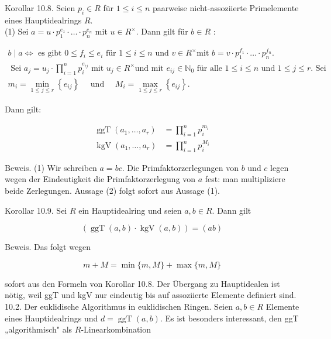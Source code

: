 \documentclass[10pt, letterpaper]{article}
\begin{document}
Korollar 10.8. Seien $p_{i} \in R$ für $1 \leq i \leq n$ paarweise nicht-assoziierte Primelemente eines Hauptidealrings $R$.\\
(1) Sei $a=u \cdot p_{1}^{e_{1}} \cdot \ldots \cdot p_{n}^{e_{n}}$ mit $u \in R^{\times}$. Dann gilt für $b \in R$ :

$$
\begin{gathered}
b \mid a \Longleftrightarrow \text { es gibt } 0 \leq f_{i} \leq e_{i} \text { für } 1 \leq i \leq n \text { und } v \in R^{\times} \text {mit } b=v \cdot p_{1}^{f_{1}} \cdot \ldots \cdot p_{n}^{f_{n}} . \\
\text { Sei } a_{j}=u_{j} \cdot \prod_{i=1}^{n} p_{i}^{e_{i j}} \text { mit } u_{j} \in R^{\times} \text {und mit } e_{i j} \in \mathbb{N}_{0} \text { für alle } 1 \leq i \leq n \text { und } 1 \leq j \leq r . \text { Sei } \\
m_{i}=\min _{1 \leq j \leq r}\left\{e_{i j}\right\} \quad \text { und } \quad M_{i}=\max _{1 \leq j \leq r}\left\{e_{i j}\right\} .
\end{gathered}
$$

Dann gilt:

$$
\begin{aligned}
\operatorname{ggT}\left(a_{1}, \ldots, a_{r}\right) & =\prod_{i=1}^{n} p_{i}^{m_{i}} \\
\operatorname{kgV}\left(a_{1}, \ldots, a_{r}\right) & =\prod_{i=1}^{n} p_{i}^{M_{i}}
\end{aligned}
$$

Beweis. (1) Wir schreiben $a=b c$. Die Primfaktorzerlegungen von $b$ und $c$ legen wegen der Eindeutigkeit die Primfaktorzerlegung von $a$ fest: man multipliziere beide Zerlegungen. Aussage (2) folgt sofort aus Aussage (1).

Korollar 10.9. Sei $R$ ein Hauptidealring und seien $a, b \in R$. Dann gilt

$$
(\operatorname{ggT}(a, b) \cdot \operatorname{kgV}(a, b))=(a b)
$$

Beweis. Das folgt wegen

$$
m+M=\min \{m, M\}+\max \{m, M\}
$$

sofort aus den Formeln von Korollar 10.8. Der Übergang zu Hauptidealen ist nötig, weil ggT und kgV nur eindeutig bis auf assoziierte Elemente definiert sind.\\
10.2. Der euklidische Algorithmus in euklidischen Ringen. Seien $a, b \in R$ Elemente eines Hauptidealrings und $d=\operatorname{ggT}(a, b)$. Es ist besonders interessant, den ggT „algorithmisch" als $R$-Linearkombination
\end{document}
